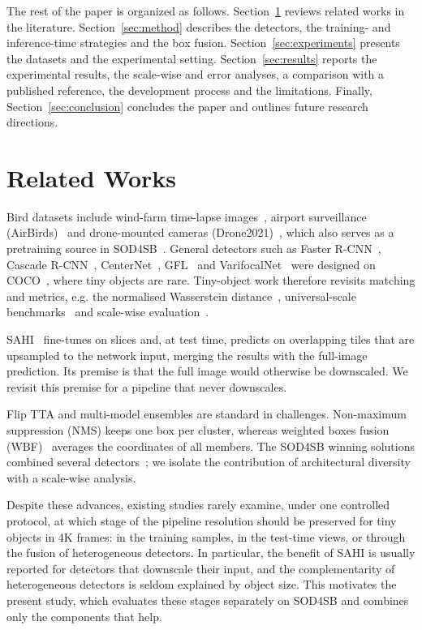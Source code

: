 \documentclass[pdflatex,sn-mathphys-num]{sn-jnl}%
\begin{document}
The rest of the paper is organized as follows. Section~\ref{sec:related} reviews related works in the literature.
Section~\ref{sec:method} describes the detectors, the training- and inference-time strategies and the box fusion.
Section~\ref{sec:experiments} presents the datasets and the experimental setting. Section~\ref{sec:results} reports the
experimental results, the scale-wise and error analyses, a comparison with a published reference, the development
process and the limitations. Finally, Section~\ref{sec:conclusion} concludes the paper and outlines future research
directions.

\section{Related Works}
\label{sec:related}
Bird datasets include wind-farm time-lapse images~\cite{yoshihashi2017windfarm}, airport surveillance
(AirBirds)~\cite{sun2022airbirds} and drone-mounted cameras (Drone2021)~\cite{fujii2021distant}, which also
serves as a pretraining source in SOD4SB~\cite{kondo2023sod4sb}. General detectors such as Faster
R-CNN~\cite{ren2015faster}, Cascade R-CNN~\cite{cai2018cascade}, CenterNet~\cite{zhou2019objects}, GFL~\cite{li2020gfl}
and VarifocalNet~\cite{zhang2021varifocalnet} were designed on COCO~\cite{lin2014coco}, where tiny objects are
rare. Tiny-object work therefore revisits matching and metrics, e.g. the normalised Wasserstein
distance~\cite{wang2021nwd}, universal-scale benchmarks~\cite{shinya2022usb} and scale-wise evaluation~\cite{shinya2023bandre}.

SAHI~\cite{akyon2022sahi} fine-tunes on slices and, at test time, predicts on overlapping tiles that are
upsampled to the network input, merging the results with the full-image prediction. Its premise is that the
full image would otherwise be downscaled. We revisit this premise for a pipeline that never downscales.

Flip TTA and multi-model ensembles are standard in challenges. Non-maximum suppression (NMS) keeps one box per
cluster, whereas weighted boxes fusion (WBF)~\cite{solovyev2021wbf} averages the coordinates of all members.
The SOD4SB winning solutions combined several detectors~\cite{kondo2023sod4sb,hou2023ensemble}; we isolate the
contribution of architectural diversity with a scale-wise analysis.

Despite these advances, existing studies rarely examine, under one controlled protocol, at which stage of the
pipeline resolution should be preserved for tiny objects in 4K frames: in the training samples, in the test-time
views, or through the fusion of heterogeneous detectors. In particular, the benefit of SAHI is usually reported for
detectors that downscale their input, and the complementarity of heterogeneous detectors is seldom
explained by object size. This motivates the present study, which evaluates these stages separately on SOD4SB and
combines only the components that help.
\end{document}
